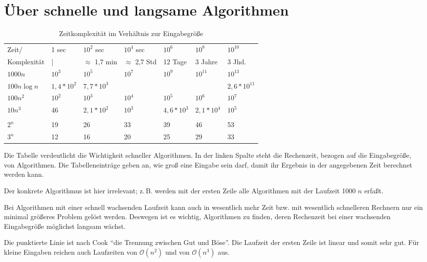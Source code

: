 \documentclass[ngerman,draft,parskip=half*,twoside]{scrreprt}
\theoremstyle{break}
\theoremstyle{nonumberbreak}
\newcommand*{\OO}{\mathcal{O}}      %
\begin{document}
\section{Über schnelle und langsame Algorithmen}
\begin{table}[h]
  \begin{tabular}{*{7}{|l}|}
    \hline
    Zeit/ & 1 sec & $10^2$ sec & $10^4$ sec & $10^6$ & $10^8$ & $10^{10}$ \\
    Komplexität & | & $\approx$ 1,7 min & $\approx$ 2,7 Std & 12 Tage & 3 Jahre & 3 Jhd.\\
    \hline
    $1000n$ & $10^3$ & $10^5$ & $10^7$ & $10^9$ & $10^{11}$ & $10^{13}$ \\
    $100n\log n$ & $1,4*10^2$ & $7,7*10^3$ & & & & $2,6*10^{11}$ \\
    $100n^2$ & $10^2$ & $10^3$ & $10^4$ & $10^5$ & $10^6$ & $10^7$\\
    $10n^3$ & 46 & $2,1*10^2$ & $10^3$ & $4,6*10^3$ & $2,1*10^4$ & $10^5$ \\
    \\
    $2^n$ & 19 & 26 & 33 & 39 & 46 & 53\\
    $3^n$ & 12 & 16 & 20 & 25 & 29 & 33\\
    \hline
  \end{tabular}
  \caption{Zeitkomplexität im Verhältnis zur Eingabegröße}
\end{table}

Die Tabelle verdeutlicht die Wichtigkeit schneller Algorithmen. 
In der linken Spalte steht die Rechenzeit, bezogen auf die Eingabegröße, von Algorithmen. 
Die Tabelleneinträge geben an, wie groß eine Eingabe sein darf, damit ihr Ergebnis in der angegebenen Zeit berechnet werden kann. 

Der konkrete Algorithmus ist hier irrelevant; z.\,B. werden mit der ersten Zeile alle Algorithmen mit der Laufzeit 1000 $n$ erfaßt. 

Bei Algorithmen mit einer schnell wachsenden Laufzeit kann auch in wesentlich mehr Zeit bzw. mit wesentlich schnelleren Rechnern nur ein
minimal größeres Problem gelöst werden. Deswegen ist es wichtig, Algorithmen zu finden, deren Rechenzeit bei einer wachsenden
Eingabegröße möglichst langsam wächst.

Die punktierte Linie ist nach Cook "`die Trennung zwischen Gut und
Böse"'. Die Laufzeit der ersten Zeile ist linear und somit sehr gut.
Für kleine Eingaben reichen auch Laufzeiten von $\OO(n^2)$ und von $\OO(n^3)$ aus.
\end{document}

